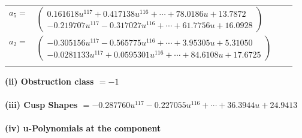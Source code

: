 \documentclass[1p]{elsarticle_modified}
\theoremstyle{definition}
\begin{document}
\begin{tabular}{m{7pt} m{180pt} m{7pt} m{180pt} }
\flushright $a_{5}=$&$\begin{pmatrix}0.161618 u^{117}+0.417138 u^{116}+\cdots+78.0186 u+13.7872\\-0.219707 u^{117}-0.317027 u^{116}+\cdots+61.7756 u+16.0928\end{pmatrix}$ \\
\flushright $a_{2}=$&$\begin{pmatrix}-0.305156 u^{117}-0.565775 u^{116}+\cdots+3.95305 u+5.31050\\-0.0281133 u^{117}+0.0595301 u^{116}+\cdots+84.6108 u+17.6725\end{pmatrix}$\\&\end{tabular}
\flushleft \textbf{(ii) Obstruction class $= -1$}\\~\\
\flushleft \textbf{(iii) Cusp Shapes $= -0.287760 u^{117}-0.227055 u^{116}+\cdots+36.3944 u+24.9413$}\\~\\
\newpage\renewcommand{\arraystretch}{1}
\flushleft \textbf{(iv) u-Polynomials at the component}\newline \\
\end{document}
